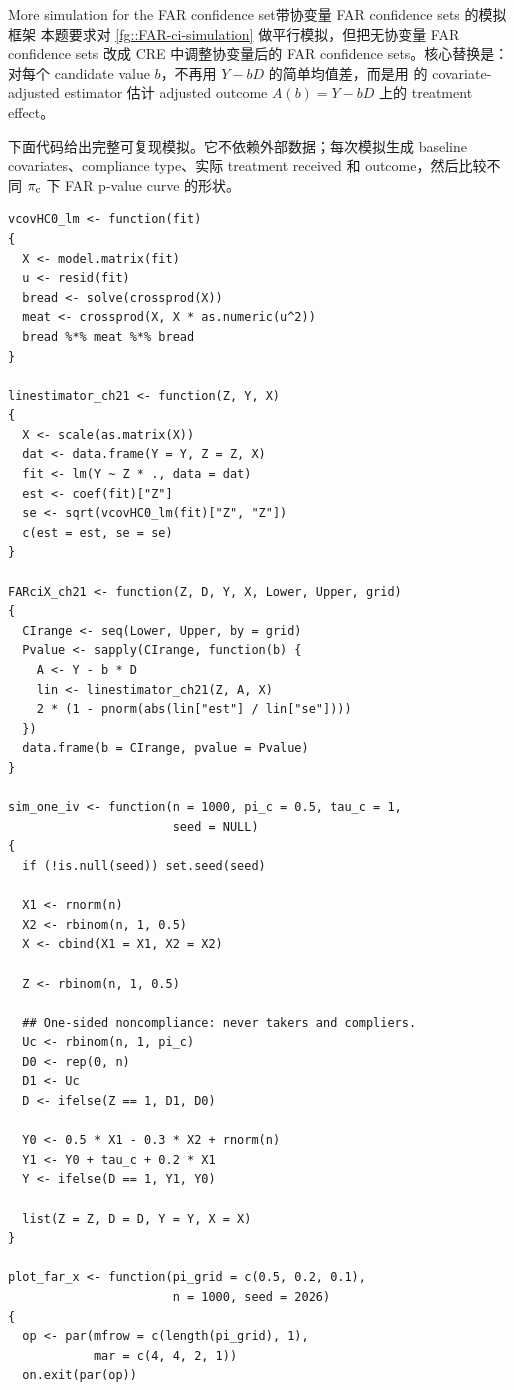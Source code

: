 \begin{exercisesolution}{More simulation for the FAR confidence set}{带协变量 FAR confidence sets 的模拟框架}
本题要求对 \cref{fg::FAR-ci-simulation} 做平行模拟，但把无协变量 FAR confidence sets 改成 CRE 中调整协变量后的 FAR confidence sets。核心替换是：对每个 candidate value $b$，不再用 $Y-bD$ 的简单均值差，而是用 \citet{lin2013} 的 covariate-adjusted estimator 估计 adjusted outcome $A(b)=Y-bD$ 上的 treatment effect。

下面代码给出完整可复现模拟。它不依赖外部数据；每次模拟生成 baseline covariates、compliance type、实际 treatment received 和 outcome，然后比较不同 $\pi_{\textup{c}}$ 下 FAR p-value curve 的形状。

\begin{lstlisting}
vcovHC0_lm <- function(fit)
{
  X <- model.matrix(fit)
  u <- resid(fit)
  bread <- solve(crossprod(X))
  meat <- crossprod(X, X * as.numeric(u^2))
  bread %*% meat %*% bread
}

linestimator_ch21 <- function(Z, Y, X)
{
  X <- scale(as.matrix(X))
  dat <- data.frame(Y = Y, Z = Z, X)
  fit <- lm(Y ~ Z * ., data = dat)
  est <- coef(fit)["Z"]
  se <- sqrt(vcovHC0_lm(fit)["Z", "Z"])
  c(est = est, se = se)
}

FARciX_ch21 <- function(Z, D, Y, X, Lower, Upper, grid)
{
  CIrange <- seq(Lower, Upper, by = grid)
  Pvalue <- sapply(CIrange, function(b) {
    A <- Y - b * D
    lin <- linestimator_ch21(Z, A, X)
    2 * (1 - pnorm(abs(lin["est"] / lin["se"])))
  })
  data.frame(b = CIrange, pvalue = Pvalue)
}

sim_one_iv <- function(n = 1000, pi_c = 0.5, tau_c = 1,
                       seed = NULL)
{
  if (!is.null(seed)) set.seed(seed)

  X1 <- rnorm(n)
  X2 <- rbinom(n, 1, 0.5)
  X <- cbind(X1 = X1, X2 = X2)

  Z <- rbinom(n, 1, 0.5)

  ## One-sided noncompliance: never takers and compliers.
  Uc <- rbinom(n, 1, pi_c)
  D0 <- rep(0, n)
  D1 <- Uc
  D <- ifelse(Z == 1, D1, D0)

  Y0 <- 0.5 * X1 - 0.3 * X2 + rnorm(n)
  Y1 <- Y0 + tau_c + 0.2 * X1
  Y <- ifelse(D == 1, Y1, Y0)

  list(Z = Z, D = D, Y = Y, X = X)
}

plot_far_x <- function(pi_grid = c(0.5, 0.2, 0.1),
                       n = 1000, seed = 2026)
{
  op <- par(mfrow = c(length(pi_grid), 1),
            mar = c(4, 4, 2, 1))
  on.exit(par(op))


\end{lstlisting}
\end{exercisesolution}
